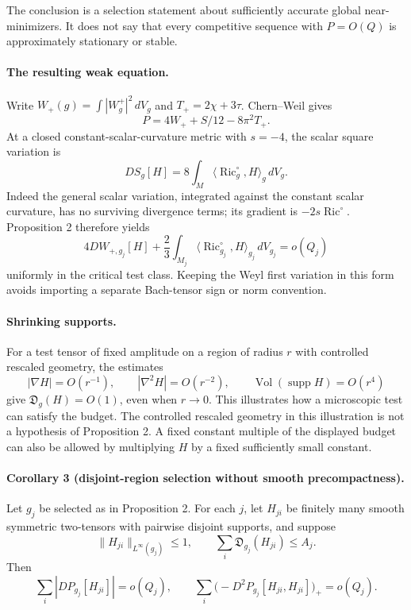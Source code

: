 \documentclass[11pt]{article}
\begin{document}
The conclusion is a selection statement about sufficiently accurate
global near-minimizers. It does not say that every competitive sequence
with $P=O(Q)$ is approximately stationary or stable.

\paragraph{The resulting weak equation.}
Write $W_+(g)=\int|W_g^+|^2\,dV_g$ and $T_+=2\chi+3\tau$.
Chern--Weil gives
\[
                 P=4W_++S/12-8\pi^2T_+.
\]
At a closed constant-scalar-curvature metric with $s=-4$, the scalar
square variation is
\[
 DS_g[H]=8\int_M\langle\operatorname{Ric}^{\circ}_g,H\rangle_g\,dV_g.
\]
Indeed the general scalar variation, integrated against the constant
scalar curvature, has no surviving divergence terms; its gradient is
$-2s\operatorname{Ric}^{\circ}$.
Proposition 2 therefore yields
\begin{equation}
 4DW_{+,g_j}[H]
 +\frac23\int_{M_j}
       \langle\operatorname{Ric}^{\circ}_{g_j},H\rangle_{g_j}\,dV_{g_j}
       =o(Q_j)
 \label{eq:o11-var-weak-equation-20260929}
\end{equation}
uniformly in the critical test class. Keeping the Weyl first variation
in this form avoids importing a separate Bach-tensor sign or norm
convention.

\paragraph{Shrinking supports.}
For a test tensor of fixed amplitude on a region of radius $r$ with
controlled rescaled geometry, the estimates
\[
 |\nabla H|=O(r^{-1}),\qquad |\nabla^2H|=O(r^{-2}),\qquad
 \operatorname{Vol}(\operatorname{supp}H)=O(r^4)
\]
give $\mathfrak D_g(H)=O(1)$, even when $r\to0$.
This illustrates how a microscopic test can satisfy the budget. The
controlled rescaled geometry in this illustration is not a hypothesis
of Proposition 2. A fixed constant multiple of the displayed budget
can also be allowed by multiplying $H$ by a fixed sufficiently small
constant.

\paragraph{Corollary 3 (disjoint-region selection without smooth precompactness).}
Let $g_j$ be selected as in Proposition 2. For each $j$, let
$H_{ji}$ be finitely many smooth symmetric two-tensors with pairwise
disjoint supports, and suppose
\[
 \|H_{ji}\|_{L^\infty(g_j)}\le1,
 \qquad \sum_i\mathfrak D_{g_j}(H_{ji})\le A_j.
\]
Then
\begin{equation}
 \sum_i|DP_{g_j}[H_{ji}]|=o(Q_j),\qquad
 \sum_i\bigl(-D^2P_{g_j}[H_{ji},H_{ji}]\bigr)_+=o(Q_j).
 \label{eq:o11-var-multiregion-20260929}
\end{equation}
\end{document}
